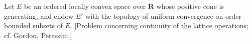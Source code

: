 Let $E$ be an ordered locally convex space over $\mathbf{R}$ whose positive cone is generating, and endow $E'$ with the topology of uniform convergence on order-bounded subsets of $E$. [Problem concerning continuity of the lattice operations; cf. Gordon, Peressini.]
